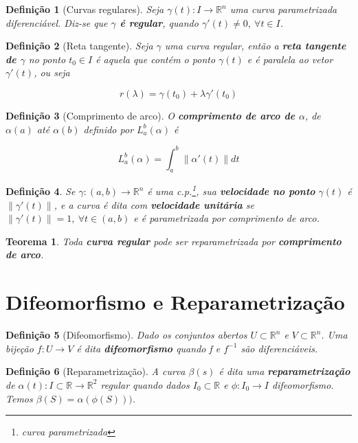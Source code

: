 \documentclass{article}
\newtheorem{theorem}{Teorema}
\newtheorem{definition}{Definição}
\begin{document}
\begin{definition}[Curvas regulares]
Seja $\gamma (t): I \rightarrow \mathbb{R}^n$ uma curva parametrizada diferenciável. Diz-se que \textbf{$\gamma$ é regular}, quando $\gamma'(t) \neq 0,\ \forall t \in I$. 
\end{definition}

\begin{definition}[Reta tangente]
Seja $\gamma$ uma curva regular, então a \textbf{reta tangente de $\gamma$} no ponto $t_0 \in I$ é aquela que contém o ponto $\gamma(t)$ e é paralela ao vetor $\gamma'(t)$, ou seja

$$r(\lambda) = \gamma(t_0) + \lambda \gamma'(t_0)$$
\end{definition}

\begin{definition}[Comprimento de arco]
O \textbf{comprimento de arco de $\alpha$}, de $\alpha(a)$ até $\alpha(b)$ definido por $L_a^b (\alpha)$ é  

$$L_a^b (\alpha) = \int_a^b \| \alpha'(t) \| d t$$
\end{definition}

\begin{definition}
Se $\gamma: (a, b) \rightarrow \mathbb{R}^n$ é uma c.p.\footnote{curva parametrizada}, sua \textbf{velocidade no ponto} $\gamma(t)$ é $\| \gamma'(t) \|$, e a curva é dita com \textbf{velocidade unitária} se $\| \gamma'(t) \| = 1,\ \forall t \in (a, b)$ e é parametrizada por comprimento de arco.
\end{definition}

\begin{theorem}
Toda \textbf{curva regular} pode ser reparametrizada por \textbf{comprimento de arco}.
\end{theorem}

\section*{Difeomorfismo e Reparametrização}
\label{s2}

\begin{definition}[Difeomorfismo]
Dado os conjuntos abertos $U \subset \mathbb{R}^n$ e $V \subset \mathbb{R}^n$. Uma bijeção $f: U \rightarrow V$ é dita \textbf{difeomorfismo} quando f e $f^{-1}$ são diferenciáveis.
\end{definition}

\begin{definition}[Reparametrização]
A curva $\beta(s)$ é dita uma \textbf{reparametrização} de $\alpha(t): I \subset \mathbb{R} \rightarrow \mathbb{R}^2$ regular quando dados $I_0 \subset \mathbb{R}$ e $\phi: I_0 \rightarrow I$ difeomorfismo. Temos $\beta(S) = \alpha(\phi(S)))$.
\end{definition}
\end{document}
